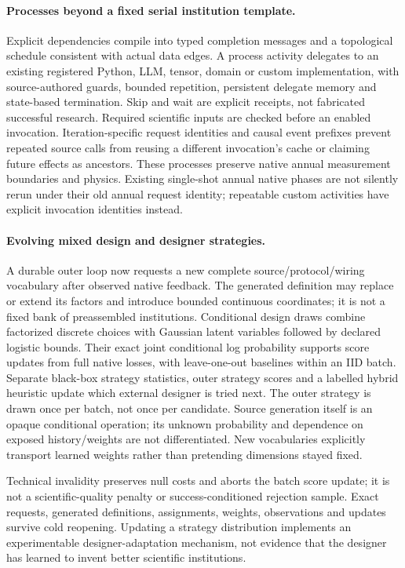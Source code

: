 \paragraph{Processes beyond a fixed serial institution template.}
Explicit dependencies compile into typed completion messages and a topological
schedule consistent with actual data edges. A process activity delegates to an
existing registered Python, LLM, tensor, domain or custom implementation, with
source-authored guards, bounded repetition, persistent delegate memory and
state-based termination. Skip and wait are explicit receipts, not fabricated
successful research. Required scientific inputs are checked before an enabled
invocation. Iteration-specific request identities and causal event prefixes
prevent repeated source calls from reusing a different invocation's cache or
claiming future effects as ancestors. These processes preserve native annual
measurement boundaries and physics. Existing single-shot annual native phases
are not silently rerun under their old annual request identity; repeatable
custom activities have explicit invocation identities instead.

\paragraph{Evolving mixed design and designer strategies.}
A durable outer loop now requests a new complete source/protocol/wiring vocabulary
after observed native feedback. The generated definition may replace or extend
its factors and introduce bounded continuous coordinates; it is not a fixed bank
of preassembled institutions. Conditional design draws combine factorized
discrete choices with Gaussian latent variables followed by declared logistic
bounds. Their exact joint conditional log probability supports score updates
from full native losses, with leave-one-out baselines within an IID batch.
Separate black-box strategy statistics, outer strategy scores and a labelled
hybrid heuristic update which external designer is tried next. The outer strategy
is drawn once per batch, not once per candidate. Source generation itself is an
opaque conditional operation; its unknown probability and dependence on exposed
history/weights are not differentiated. New vocabularies explicitly transport
learned weights rather than pretending dimensions stayed fixed.

Technical invalidity preserves null costs and aborts the batch score update;
it is not a scientific-quality penalty or success-conditioned rejection sample.
Exact requests, generated definitions, assignments, weights, observations and
updates survive cold reopening. Updating a strategy distribution implements an
experimentable designer-adaptation mechanism, not evidence that the designer
has learned to invent better scientific institutions.

